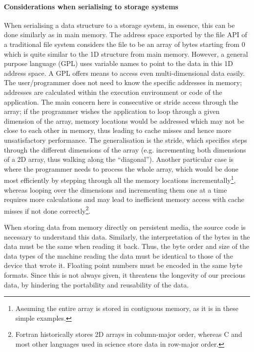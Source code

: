 \paragraph{Considerations when serialising to storage systems}


When serialising a data structure to a storage system, in essence, this can be done similarly as in main memory.
The address space exported by the file API of a traditional file system considers the file to be an array of bytes starting from 0 which is quite similar to the 1D structure from main memory.
However, a general purpose language (GPL) uses variable names to point to the data in this 1D address space.
A GPL offers means to access even multi-dimensional data easily.
The user/programmer does not need to know the specific addresses in memory; addresses are calculated within the execution environment or code of the application.
The main concern here is consecutive or stride access through the array; if the programmer wishes the application to loop through a given dimension of the array, memory locations would be addressed which may not be close to each other in memory, thus leading to cache misses and hence more unsatisfactory performance.
The generalisation is the stride, which specifies steps through the different dimensions of the array (e.g. incrementing both dimensions of a 2D array, thus walking along the ``diagonal'').
Another particular case is where the programmer needs to process the whole array, which would be done most efficiently by stepping through all the memory locations incrementally\footnote{Assuming the entire array is stored in contiguous memory, as it is in these simple examples.},
whereas looping over the dimensions and incrementing them one at a time requires more calculations and may lead to inefficient memory access with cache misses if not done correctly\footnote{Fortran historically stores 2D arrays in column-major order, whereas C and most other languages used in science store data in row-major order.}.


\medskip

When storing data from memory directly on persistent media, the source code is necessary to understand this data.
Similarly, the interpretation of the bytes in the data must be the same when reading it back. Thus, the byte order and size of the data types of the machine reading the data must be identical to those of the device that wrote it.  Floating point numbers must be encoded in the same byte formats.
Since this is not always given, it threatens the longevity of our precious data, by hindering the portability and reusability of the data.

